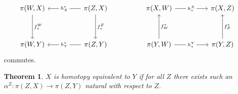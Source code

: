 \documentclass[40pt]{article}
\newtheorem{theorem}{Theorem}[section]
\begin{document}
	\[\begin{tikzcd}
		{\pi(W,X)} && {\pi(Z,X)} && {\pi(X,W)} && {\pi(X,Z)} \\
		\\
		{\pi(W,Y)} && {\pi(Z,Y)} && {\pi(Y,W)} && {\pi(Y,Z)}
		\arrow["{f_*^W}", from=1-1, to=3-1]
		\arrow["{h^*_X}"{description}, from=1-3, to=1-1]
		\arrow["{f_*^Z}", from=1-3, to=3-3]
		\arrow["{h_*^X}"{description}, from=1-5, to=1-7]
		\arrow["{h^*_Y}"{description}, from=3-3, to=3-1]
		\arrow["{f^*_W}"', from=3-5, to=1-5]
		\arrow["{h_*^Y}"{description}, from=3-5, to=3-7]
		\arrow["{f^*_Z}"', from=3-7, to=1-7]
	\end{tikzcd}\]
	commutes.
	\begin{theorem}
		$X$ is homotopy equivalent to $Y$ if for all $Z$ there exists such an $\alpha^Z : \pi(Z,X)\rightarrow \pi(Z,Y)$ natural with respect to $Z$. 
	\end{theorem}
\end{document}
